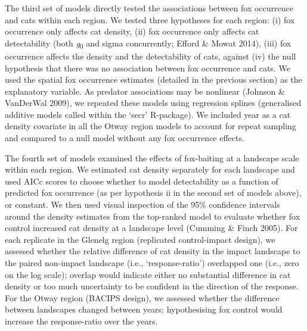 \documentclass[]{elsarticle} %
\begin{document}
The third set of models directly tested the associations between fox occurrence and cats within each region. We tested three hypotheses for each region: (i) fox occurrence only affects cat density, (ii) fox occurrence only affects cat detectability (both \emph{g}\textsubscript{0} and sigma concurrently; Efford \& Mowat 2014), (iii) fox occurrence affects the density and the detectability of cats, against (iv) the null hypothesis that there was no association between fox occurrence and cats. We used the spatial fox occurrence estimates (detailed in the previous section) as the explanatory variable. As predator associations may be nonlinear (Johnson \& VanDerWal 2009), we repeated these models using regression splines (generalised additive models called within the `secr' R-package). We included year as a cat density covariate in all the Otway region models to account for repeat sampling and compared to a null model without any fox occurrence effects.

The fourth set of models examined the effects of fox-baiting at a landscape scale within each region. We estimated cat density separately for each landscape and used AICc scores to choose whether to model detectability as a function of predicted fox occurrence (as per hypothesis ii in the second set of models above), or constant. We then used visual inspection of the 95\% confidence intervals around the density estimates from the top-ranked model to evaluate whether fox control increased cat density at a landscape level (Cumming \& Finch 2005). For each replicate in the Glenelg region (replicated control-impact design), we assessed whether the relative difference of cat density in the impact landscape to the paired non-impact landscape (i.e., `response-ratio') overlapped one (i.e., zero on the log scale); overlap would indicate either no substantial difference in cat density or too much uncertainty to be confident in the direction of the response. For the Otway region (BACIPS design), we assessed whether the difference between landscapes changed between years; hypothesising fox control would increase the response-ratio over the years.

\newpage
\end{document}

